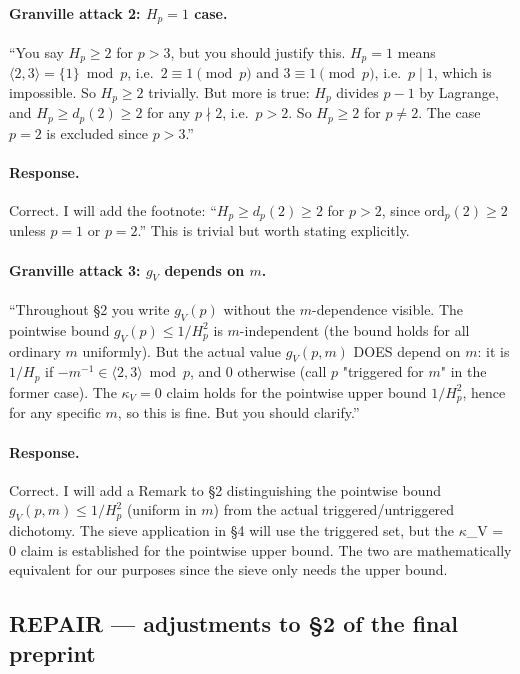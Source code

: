 \paragraph{Granville attack 2: $H_{p} = 1$ case.}
``You say $H_{p} \geq 2$ for $p > 3$, but you should justify this.
$H_{p} = 1$ means $\langle 2, 3 \rangle = \{1\} \bmod p$, i.e.\
$2 \equiv 1 \pmod p$ and $3 \equiv 1 \pmod p$, i.e.\ $p \mid 1$, which
is impossible. So $H_{p} \geq 2$ trivially. But more is true: $H_{p}$
divides $p - 1$ by Lagrange, and $H_{p} \geq d_{p}(2) \geq 2$ for any
$p \nmid 2$, i.e.\ $p > 2$. So $H_{p} \geq 2$ for $p \neq 2$. The case
$p = 2$ is excluded since $p > 3$.''

\paragraph{Response.} Correct. I will add the footnote: ``$H_{p} \geq
d_{p}(2) \geq 2$ for $p > 2$, since $\mathrm{ord}_{p}(2) \geq 2$
unless $p = 1$ or $p = 2$.'' This is trivial but worth stating
explicitly.

\paragraph{Granville attack 3: $g_{V}$ depends on $m$.}
``Throughout \S2 you write $g_{V}(p)$ without the $m$-dependence
visible. The pointwise bound $g_{V}(p) \leq 1/H_{p}^{2}$ is
$m$-independent (the bound holds for all ordinary $m$ uniformly). But
the actual value $g_{V}(p, m)$ DOES depend on $m$: it is $1/H_{p}$ if
$-m^{-1} \in \langle 2, 3 \rangle \bmod p$, and $0$ otherwise (call $p$
"triggered for $m$" in the former case). The $\kappa_{V} = 0$ claim
holds for the pointwise upper bound $1/H_{p}^{2}$, hence for any
specific $m$, so this is fine. But you should clarify.''

\paragraph{Response.} Correct. I will add a Remark to \S2 distinguishing
the pointwise bound $g_{V}(p, m) \leq 1/H_{p}^{2}$ (uniform in $m$)
from the actual triggered/untriggered dichotomy. The sieve application
in \S4 will use the triggered set, but the $\kappa$_V = 0 claim is established
for the pointwise upper bound. The two are mathematically equivalent
for our purposes since the sieve only needs the upper bound.

\subsection*{REPAIR --- adjustments to \S2 of the final preprint}


